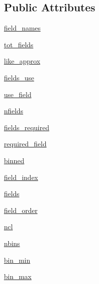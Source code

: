 \subsection*{Public Attributes}
\begin{DoxyCompactItemize}
\item 
\mbox{\hyperlink{classCMBlikes_1_1DatasetLikelihood_ac40644fe79fe55208cfdd5bcbdbc16b0}{field\+\_\+names}}
\item 
\mbox{\hyperlink{classCMBlikes_1_1DatasetLikelihood_aee7563e2356d79e1c9a400ee92f4d24b}{tot\+\_\+fields}}
\item 
\mbox{\hyperlink{classCMBlikes_1_1DatasetLikelihood_a5834e3b5ca088945eb85c591557096bf}{like\+\_\+approx}}
\item 
\mbox{\hyperlink{classCMBlikes_1_1DatasetLikelihood_ad2658eac554ec642bb410152fc069727}{fields\+\_\+use}}
\item 
\mbox{\hyperlink{classCMBlikes_1_1DatasetLikelihood_a16ee80f3573ff08b64af34dfc3f8203a}{use\+\_\+field}}
\item 
\mbox{\hyperlink{classCMBlikes_1_1DatasetLikelihood_a3b41d2d7ccd4ed567efa280bd3e26d2b}{nfields}}
\item 
\mbox{\hyperlink{classCMBlikes_1_1DatasetLikelihood_ad7163afad245eca6886e67ac77a2c570}{fields\+\_\+required}}
\item 
\mbox{\hyperlink{classCMBlikes_1_1DatasetLikelihood_ad9f5e2d073d51f93fabcf0a0f4c87d42}{required\+\_\+field}}
\item 
\mbox{\hyperlink{classCMBlikes_1_1DatasetLikelihood_a6013beef86cdbffc3c210d7c49be1237}{binned}}
\item 
\mbox{\hyperlink{classCMBlikes_1_1DatasetLikelihood_a64d7fde24990583e63875f7c0bf9939b}{field\+\_\+index}}
\item 
\mbox{\hyperlink{classCMBlikes_1_1DatasetLikelihood_a69c41015095dc75122c2a506e0ce072d}{fields}}
\item 
\mbox{\hyperlink{classCMBlikes_1_1DatasetLikelihood_a40b87c5e82d2ecfe56672a801daf8249}{field\+\_\+order}}
\item 
\mbox{\hyperlink{classCMBlikes_1_1DatasetLikelihood_a1d6c527815c536c5ef7da634ae7d890e}{ncl}}
\item 
\mbox{\hyperlink{classCMBlikes_1_1DatasetLikelihood_af09a13d76ee5297218456457994c17eb}{nbins}}
\item 
\mbox{\hyperlink{classCMBlikes_1_1DatasetLikelihood_a110ccf459c9455830d57365f1df3e240}{bin\+\_\+min}}
\item 
\mbox{\hyperlink{classCMBlikes_1_1DatasetLikelihood_ab32573fca0f23cfcbb3283081ead87b3}{bin\+\_\+max}}

\end{DoxyCompactItemize}
